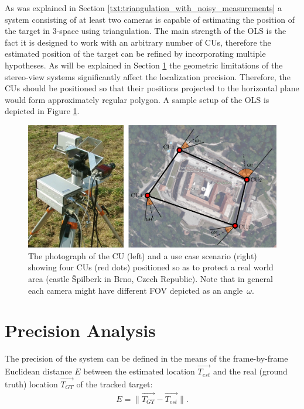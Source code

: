 As was explained in Section \ref{txt:triangulation_with_noisy_measurements} a system consisting of at least two cameras is capable of estimating the position of the target in 3-space using triangulation. The main strength of the OLS is the fact it is designed to work with an arbitrary number of CUs, therefore the estimated position of the target can be refined by incorporating multiple hypotheses. As will be explained in Section \ref{txt:precision_analysis} the geometric limitations of the stereo-view systems significantly affect the localization precision. Therefore, the CUs should be positioned so that their positions projected to the horizontal plane would form approximately regular polygon. A sample setup of the OLS is depicted in Figure \ref{fig:cu_and_topology}.

\begin{figure}[htb]\centering
	\centering
	\includegraphics[width=0.75\linewidth]{fig/cu_and_spilberk_camera_units.pdf}
	\caption{The photograph of the CU (left) and a use case scenario (right) showing four CUs (red dots) positioned so as to protect a real world area (castle Špilberk in Brno, Czech Republic). Note that in general each camera might have different FOV depicted as an angle~$\omega$.}
	\label{fig:cu_and_topology}
\end{figure}

\section{Precision Analysis} \label{txt:precision_analysis}

The precision of the system can be defined in the means of the frame-by-frame Euclidean distance $E$ between the estimated location $\vec{T_{est}}$ and the real (ground truth) location $\vec{T_{GT}}$ of the tracked target:
\begin{align}
	E = \lVert \vec{T_{GT}} - \vec{T_{est}} \rVert.
\end{align}

